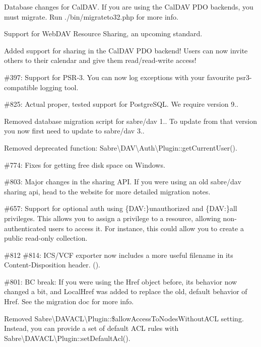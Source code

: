 \begin{DoxyItemize}
\item Database changes for Cal\+D\+AV. If you are using the Cal\+D\+AV P\+DO backends, you must migrate. Run {\ttfamily ./bin/migrateto32.php} for more info.
\item Support for Web\+D\+AV Resource Sharing, an upcoming standard.
\item Added support for sharing in the Cal\+D\+AV P\+DO backend! Users can now invite others to their calendar and give them read/read-\/write access!
\item \#397\+: Support for P\+S\+R-\/3. You can now log exceptions with your favourite psr3-\/compatible logging tool.
\item \#825\+: Actual proper, tested support for Postgre\+S\+QL. We require version 9..
\item Removed database migration script for sabre/dav 1.. To update from that version you now first need to update to sabre/dav 3..
\item Removed deprecated function\+: {\ttfamily Sabre\textbackslash{}D\+AV\textbackslash{}Auth\textbackslash{}Plugin\+::get\+Current\+User()}.
\item \#774\+: Fixes for getting free disk space on Windows.
\item \#803\+: Major changes in the sharing A\+PI. If you were using an old sabre/dav sharing api, head to the website for more detailed migration notes.
\item \#657\+: Support for optional auth using {\ttfamily \{D\+AV\+:\}unauthorized} and {\ttfamily \{D\+AV\+:\}all} privileges. This allows you to assign a privilege to a resource, allowing non-\/authenticated users to access it. For instance, this could allow you to create a public read-\/only collection.
\item \#812 \#814\+: I\+C\+S/\+V\+CF exporter now includes a more useful filename in its {\ttfamily Content-\/\+Disposition} header. ().
\item \#801\+: BC break\+: If you were using the {\ttfamily Href} object before, it\textquotesingle{}s behavior now changed a bit, and {\ttfamily Local\+Href} was added to replace the old, default behavior of {\ttfamily Href}. See the migration doc for more info.
\item Removed {\ttfamily Sabre\textbackslash{}D\+A\+V\+A\+CL\textbackslash{}Plugin\+::\$allow\+Access\+To\+Nodes\+Without\+A\+CL} setting. Instead, you can provide a set of default A\+CL rules with {\ttfamily Sabre\textbackslash{}D\+A\+V\+A\+CL\textbackslash{}Plugin\+::set\+Default\+Acl()}.

\end{DoxyItemize}
